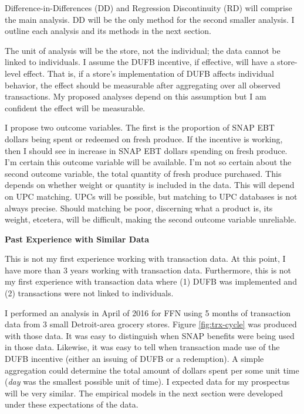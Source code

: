 \documentclass[12pt,letterpaperpaper,]{book}
\begin{document}
Difference-in-Differences (DD) and Regression Discontinuity (RD) will
comprise the main analysis. DD will be the only method for the second
smaller analysis. I outline each analysis and its methods in the next
section.

The unit of analysis will be the store, not the individual; the data
cannot be linked to individuals. I assume the DUFB incentive, if
effective, will have a store-level effect. That is, if a store's
implementation of DUFB affects individual behavior, the effect should be
measurable after aggregating over all observed transactions. My proposed
analyses depend on this assumption but I am confident the effect will be
measurable.

I propose two outcome variables. The first is the proportion of SNAP EBT
dollars being spent or redeemed on fresh produce. If the incentive is
working, then I should see in increase in SNAP EBT dollars spending on
fresh produce. I'm certain this outcome variable will be available. I'm
not so certain about the second outcome variable, the total quantity of
fresh produce purchased. This depends on whether weight or quantity is
included in the data. This will depend on UPC matching. UPCs will be
possible, but matching to UPC databases is not always precise. Should
matching be poor, discerning what a product is, its weight, etcetera,
will be difficult, making the second outcome variable unreliable.

\textbf{Past Experience with Similar Data}

This is not my first experience working with transaction data. At this
point, I have more than 3 years working with transaction data.
Furthermore, this is not my first experience with transaction data where
(1) DUFB was implemented and (2) transactions were not linked to
individuals.

I performed an analysis in April of 2016 for FFN using 5 months of
transaction data from 3 small Detroit-area grocery stores. Figure
\ref{fig:trx-cycle} was produced with those data. It was easy to
distinguish when SNAP benefits were being used in those data. Likewise,
it was easy to tell when transaction made use of the DUFB incentive
(either an issuing of DUFB or a redemption). A simple aggregation could
determine the total amount of dollars spent per some unit time
(\emph{day} was the smallest possible unit of time). I expected data for
my prospectus will be very similar. The empirical models in the next
section were developed under these expectations of the data.
\end{document}
